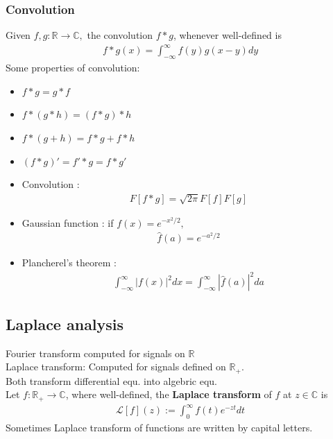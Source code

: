 \subsubsection{Convolution}
Given $f, g : \mathbb{R} \rightarrow \mathbb{C},$ the convolution $f \ast g$, whenever well-defined is 
\begin{align*}
    f \ast g (x) = \int_{-\infty}^\infty f(y)g(x-y) dy
\end{align*}
Some properties of convolution:
\begin{itemize}
    \item $f \ast g = g \ast f$
    \item $f \ast (g \ast h) = (f \ast g) \ast h$
    \item $f \ast (g+h) = f\ast g + f \ast h$
    \item $(f \ast g)' = f' \ast g = f \ast g'$
\end{itemize}
\begin{itemize}
    \item Convolution : 
    \begin{align*}
    F[f \ast g] = \sqrt{2 \pi} F[f]F[g]
    \end{align*}
    \item Gaussian function : if $f(x) = e^{-x^2/2},$ 
    \begin{align*}
        \hat{f}(a) = e^{-a^2/2}
    \end{align*}
    \item Plancherel's theorem : 
    \begin{align*}
        \int_{-\infty}^\infty |f(x)|^2dx = \int_{-\infty}^\infty  |\hat{f}(a)|^2da
    \end{align*}
\end{itemize}

\subsection{Laplace analysis}
Fourier transform computed for signals on $\mathbb{R}$ \\
Laplace transform: Computed for signals defined on $\mathbb{R_+}$. \\
Both transform differential equ. into algebric equ. \\
Let $f: \mathbb{R_+} \rightarrow \mathbb{C}$, where well-defined, the \textbf{Laplace transform} of $f$ at $z \in \mathbb{C}$ is 
\begin{align*}
    \mathcal{L}[f](z) := \int_0^\infty f(t) e^{-zt}dt
\end{align*}
Sometimes Laplace transform of functions are written by capital letters. 
